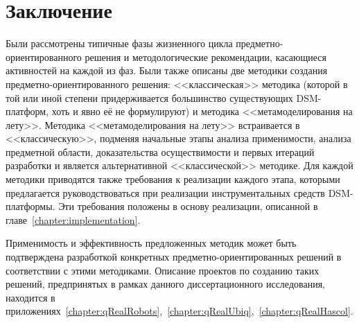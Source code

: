 \section{Заключение}
Были рассмотрены типичные фазы жизненного цикла предметно-ориентированного решения и методологические 
рекомендации, касающиеся активностей на каждой из фаз. Были также описаны две методики
создания предметно-ориентированного решения: <<классическая>> методика (которой в той или иной степени придерживается
большинство существующих \ac{DSM}-платформ, хоть и явно её не формулируют) и методика <<метамоделирования на лету>>.
Методика <<метамоделирования на лету>> встраивается в <<классическую>>, подменяя начальные этапы
анализа применимости, анализа предметной области, доказательства осуществимости и первых
итераций разработки и является альтернативной <<классической>> методике. Для каждой методики
приводятся также требования к реализации каждого этапа, которыми предлагается руководствоваться
при реализации инструментальных средств \ac{DSM}-платформы. Эти требования положены в основу реализации,
описанной в главе~\ref{chapter:implementation}.

Применимость и эффективность предложенных методик может быть подтверждена разработкой конкретных предметно-ориентированных 
решений в соответствии с этими методиками. Описание проектов по созданию таких решений, предпринятых в рамках
данного диссертационного исследования, находится в приложениях~\ref{chapter:qRealRobots},~\ref{chapter:qRealUbiq},~\ref{chapter:qRealHascol}.
